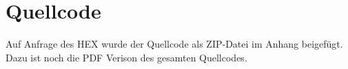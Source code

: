 \chapter{Quellcode}
Auf Anfrage des HEX wurde der Quellcode als ZIP-Datei im Anhang beigefügt. Dazu ist noch die PDF Verison des
gesamten Quellcodes.
